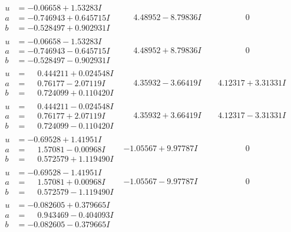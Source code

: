 \documentclass[1p]{elsarticle_modified}
\theoremstyle{definition}
\begin{document}
$$\begin{array}{c|c|c}
\begin{aligned}
u &= -0.06658 + 1.53283 I \\
a &= -0.746943 + 0.645715 I \\
b &= -0.528497 + 0.902931 I\end{aligned}
 & \phantom{-}4.48952 - 8.79836 I & \phantom{-0.000000 } 0 \\ \hline\begin{aligned}
u &= -0.06658 - 1.53283 I \\
a &= -0.746943 - 0.645715 I \\
b &= -0.528497 - 0.902931 I\end{aligned}
 & \phantom{-}4.48952 + 8.79836 I & \phantom{-0.000000 } 0 \\ \hline\begin{aligned}
u &= \phantom{-}0.444211 + 0.024548 I \\
a &= \phantom{-}0.76177 - 2.07119 I \\
b &= \phantom{-}0.724099 + 0.110420 I\end{aligned}
 & \phantom{-}4.35932 - 3.66419 I & \phantom{-}4.12317 + 3.31331 I \\ \hline\begin{aligned}
u &= \phantom{-}0.444211 - 0.024548 I \\
a &= \phantom{-}0.76177 + 2.07119 I \\
b &= \phantom{-}0.724099 - 0.110420 I\end{aligned}
 & \phantom{-}4.35932 + 3.66419 I & \phantom{-}4.12317 - 3.31331 I \\ \hline\begin{aligned}
u &= -0.69528 + 1.41951 I \\
a &= \phantom{-}1.57081 - 0.00968 I \\
b &= \phantom{-}0.572579 + 1.119490 I\end{aligned}
 & -1.05567 + 9.97787 I & \phantom{-0.000000 } 0 \\ \hline\begin{aligned}
u &= -0.69528 - 1.41951 I \\
a &= \phantom{-}1.57081 + 0.00968 I \\
b &= \phantom{-}0.572579 - 1.119490 I\end{aligned}
 & -1.05567 - 9.97787 I & \phantom{-0.000000 } 0 \\ \hline\begin{aligned}
u &= -0.082605 + 0.379665 I \\
a &= \phantom{-}0.943469 - 0.404093 I \\
b &= -0.082605 - 0.379665 I\end{aligned}

\end{array}$$
\end{document}

